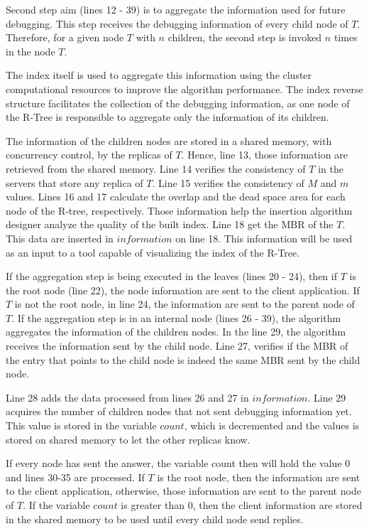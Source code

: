 Second step aim (lines 12 - 39) is to aggregate the information used for future debugging. This step receives the debugging information of every child node of $T$. 
Therefore, for a given node $T$ with $n$ children, the second step is invoked $n$ times in the node $T$.

The index itself is used to aggregate this information using the cluster computational resources to improve the algorithm performance.
The index reverse structure facilitates the collection of the debugging information, 
as one node of the R-Tree is responsible to aggregate only the information of its children. 

The information of the children nodes are stored in a shared memory, with concurrency control, by the replicas of $T$. Hence, line 13, those information are retrieved from the shared memory. 
Line 14 verifies the consistency of $T$ in the servers that store any replica of $T$. Line 15 verifies the consistency of $M$ and $m$ values. 
Lines 16 and 17 calculate the overlap and the dead space area for each node of the R-tree, respectively. Those information help the insertion algorithm designer analyze the quality of the built index. 
Line 18 get the MBR of the $T$. This data are inserted in $information$ on line 18. This information will be used as an input to a tool capable of visualizing the index of the R-Tree.
	
If the aggregation step is being executed in the leaves (lines 20 - 24), then if  $T$ is the root node (line 22), the node information are sent to the client application. 
If $T$ is not the root node, in line 24, the information are sent to the parent node of $T$. If the aggregation step is in an internal node (lines 26 - 39), the algorithm aggregates the information of the children nodes. 
In the line 29, the algorithm receives the information sent by the child node. Line 27, verifies if the MBR of the entry that points to the child node is indeed the same MBR sent by the child node.
	
Line 28 adds the data processed from lines 26 and 27 in $information$. Line 29 acquires the number of children nodes that not sent debugging information yet. 
This value is stored in the variable $count$, which is decremented and the values is stored on shared memory to let the other replicas know.
	
If every node has sent the answer, the variable count then will hold the value 0 and lines 30-35 are processed. 
If $T$ is the root node, then the information are sent to the client application, otherwise, those information are sent to the parent node of $T$. 
If the variable $count$ is greater than 0, then the client information are stored in the shared memory to be used until every child node send replies.	
	
